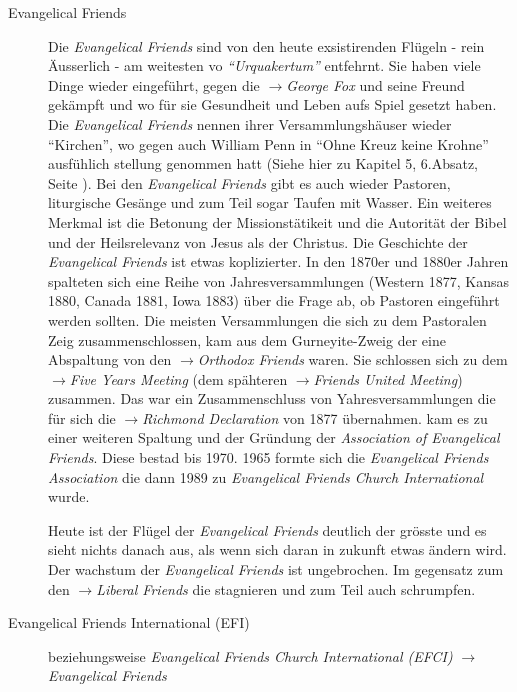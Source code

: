 \begin{description}
 \item[Evangelical Friends]
  Die \textit{Evangelical Friends} sind von den heute exsistirenden Flügeln -
  rein Äusserlich - am weitesten vo \textit{"`Urquakertum"'} entfehrnt. Sie haben
  viele Dinge wieder eingeführt, gegen die $\to$\textit{George Fox} und seine
  Freund gekämpft und wo für sie Gesundheit und Leben aufs Spiel gesetzt haben.
  Die \textit{Evangelical Friends} nennen ihrer Versammlungshäuser wieder
  "`Kirchen"', wo gegen auch William Penn in "`Ohne Kreuz keine Krohne"'
  ausfühlich stellung genommen hatt (Siehe hier zu Kapitel 5, 6.Absatz, Seite
  \pageref{kap5_ab6}). Bei den \textit{Evangelical Friends} gibt es auch wieder
  Pastoren, liturgische Gesänge und zum Teil sogar Taufen mit Wasser. Ein
  weiteres Merkmal ist die Betonung der Missionstätikeit und die Autorität der
  Bibel und der Heilsrelevanz von Jesus als der Christus.
\medskip 
  Die Geschichte der \textit{Evangelical Friends} ist etwas koplizierter. In
  den 1870er und 1880er Jahren spalteten sich eine Reihe von Jahresversammlungen
  (Western 1877, Kansas 1880, Canada 1881, Iowa 1883) über die Frage ab, ob
  Pastoren eingeführt werden sollten. Die meisten Versammlungen die sich zu dem
  Pastoralen Zeig zusammenschlossen, kam aus dem Gurneyite-Zweig der eine
  Abspaltung von den $\to$\textit{Orthodox Friends} waren. Sie schlossen sich
  zu dem $\to$\textit{Five Years Meeting} (dem spähteren $\to$\textit{Friends
  United Meeting}) zusammen. Das war ein Zusammenschluss von Yahresversammlungen
  die für sich die $\to$\textit{Richmond Declaration} von 1877 übernahmen.
 kam es zu einer weiteren Spaltung und der Gründung der
  \textit{Association of Evangelical Friends}. Diese bestad bis 1970. 1965
  formte sich die \textit{Evangelical Friends Association} die dann 1989 zu
  \textit{Evangelical Friends Church International} wurde.

  Heute ist der Flügel der \textit{Evangelical Friends} deutlich der grösste und
  es sieht nichts danach aus, als wenn sich daran in zukunft etwas ändern wird.
  Der wachstum der \textit{Evangelical Friends} ist ungebrochen. Im gegensatz
  zum den $\to$\textit{Liberal Friends} die stagnieren und zum Teil auch
  schrumpfen.


 \item[Evangelical Friends International (EFI)] beziehungsweise
 \textit{Evangelical Friends Church International (EFCI)}
 $\to$\textit{Evangelical Friends}


 \end{description}

\normalsize

